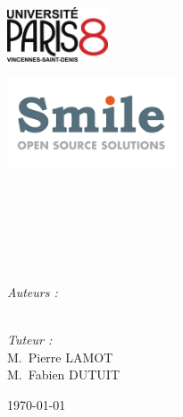 \begin{titlepage}

\begin{center}

\begin{minipage}[t]{0.48\textwidth}
  \begin{flushleft}
   \includegraphics [width=30mm]{figures/logop8.jpg} \\[0.5cm]
    \begin{spacing}{1.5}
    \end{spacing}
  \end{flushleft}
\end{minipage}
\begin{minipage}[t]{0.48\textwidth}
  \begin{flushright}
    \includegraphics [width=50mm]{figures/logo_Smile.png} \\[0.5cm]
  \end{flushright}
\end{minipage} \\[1.5cm]

\textsc{\Large \reportsubject}\\[0.5cm]

\HRule \\[0.4cm]
{\huge \bfseries \reporttitle}\\[0.4cm]
\HRule \\[1.5cm]

\vfill

\begin{minipage}[b]{0.3\textwidth}
  \begin{flushleft} \large
    \emph{Auteurs :}\\
    \reportauthora\\
  \end{flushleft}
\end{minipage}
\begin{minipage}[b]{0.6\textwidth}
  \begin{flushright} \large
    \emph{Tuteur :} \\
      M.~Pierre \textsc{LAMOT} \\
	    M.~Fabien \textsc{DUTUIT} \\
   \end{flushright}
\end{minipage}

\vfill

{\large \today}

\end{center}

\end{titlepage}
